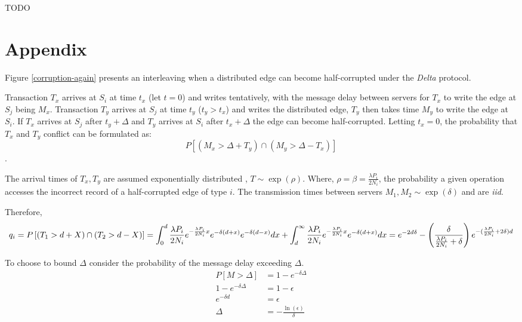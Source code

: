 \documentclass[sigplan,10pt]{acmart}
\begin{document}
TODO


\appendix
\section{Appendix}

Figure \ref{corruption-again} presents an interleaving when a distributed edge can become half-corrupted under the \emph{Delta} protocol.

Transaction $T_x$ arrives at $S_i$ at time $t_x$ (let $t=0$) and writes tentatively, with the message delay between servers for $T_x$ to write the edge at $S_j$ being $M_x$. Transaction $T_y$ arrives at $S_j$ at time $t_y$ ($t_y > t_x$) and writes the distributed edge, $T_y$ then takes time $M_y$ to write the edge at $S_i$. If $T_x$ arrives at $S_j$ after $t_y + \Delta$ and $T_y$ arrives at $S_i$ after $t_x + \Delta$ the edge can become half-corrupted. Letting $t_x = 0 $, the probability that $T_x$ and $T_y$ conflict can be formulated as: $$ P \left[ ( M_x >  \Delta + T_y) \cap (M_y > \Delta - T_x) \right]$$.

The arrival times of $T_x,T_y$ are assumed exponentially distributed , $T \sim \exp (\rho)$. Where, $ \rho = \beta = \frac{\lambda P_i}{2N_i}$, the probability a given operation accesses the incorrect record of a half-corrupted edge of type $i$. The transmission times between servers $M_1, M_2 \sim \exp (\delta)$ and are \emph{iid}.


Therefore,
\begin{dmath*}
  q_{i} =  {P \left[ ( T_1 >  d + X) \cap (T_2 > d-X)  \right]} \\
  =  \int_{0}^{d}  \frac{\lambda P_i}{2 N_i} e^{-\frac{\lambda P_i}{2 N_i} x} e^{-\delta (d+x)} e^{-\delta (d-x)} dx + \int_{d}^{\infty} \frac{\lambda P_i}{2 N_i} e^{-\frac{\lambda P_i}{2 N_i} x} e^{-\delta (d+x)} dx  \\
  =  e^{-2 d \delta} - \left( \frac{\delta}{\frac{\lambda P_i}{2 N_i} + \delta} \right) e^{-(\frac{\lambda P_i}{2 N_i}+ 2\delta)d} \\
\end{dmath*}

To choose to bound $\Delta$ consider the probability of the message delay exceeding  $\Delta$.
\begin{align*}
  P \left[ M > \Delta \right] & = 1 - e^{- \delta \Delta} \\
  1 - e^{- \delta \Delta} & = 1 - \epsilon \\
  e^{- \delta d} & = \epsilon  \\
  \Delta & = - \frac{\ln(\epsilon)}{\delta}
\end{align*}
\end{document}
